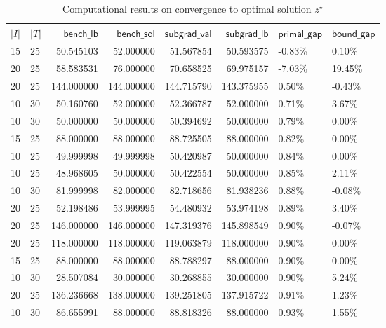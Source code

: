 \documentclass[
  a4paper,
,tablecaptionabove
]{scrartcl}
\numberwithin{equation}{section}
\begin{document}
\begin{table}
\caption{Computational results on convergence to optimal solution $z^\star$} \label{tab:sgsconv} 
\begin{tabular}{|l|l|r|r|r|r|l|l|}
\toprule
 $|I|$ & $|T|$ & $\mathsf{bench\_lb}$ &  $\mathsf{bench\_sol}$ & $\mathsf {subgrad\_val}$ &  $\mathsf{subgrad\_lb}$ & $\mathsf{primal\_gap}$ & $\mathsf{bound\_gap}$ \\
\midrule
 15 &  25 &   50.545103 &   52.000000 &    51.567854 &   50.593575 &     -0.83\% &     0.10\% \\
 20 &  25 &   58.583531 &   76.000000 &    70.658525 &   69.975157 &     -7.03\% &    19.45\% \\
 20 &  25 &  144.000000 &  144.000000 &   144.715790 &  143.375955 &      0.50\% &    -0.43\% \\
 10 &  30 &   50.160760 &   52.000000 &    52.366787 &   52.000000 &      0.71\% &     3.67\% \\
 10 &  30 &   50.000000 &   50.000000 &    50.394692 &   50.000000 &      0.79\% &     0.00\% \\
 15 &  25 &   88.000000 &   88.000000 &    88.725505 &   88.000000 &      0.82\% &     0.00\% \\
 10 &  25 &   49.999998 &   49.999998 &    50.420987 &   50.000000 &      0.84\% &     0.00\% \\
 10 &  25 &   48.968605 &   50.000000 &    50.422554 &   50.000000 &      0.85\% &     2.11\% \\
 10 &  30 &   81.999998 &   82.000000 &    82.718656 &   81.938236 &      0.88\% &    -0.08\% \\
 20 &  25 &   52.198486 &   53.999995 &    54.480932 &   53.974198 &      0.89\% &     3.40\% \\
 20 &  25 &  146.000000 &  146.000000 &   147.319376 &  145.898549 &      0.90\% &    -0.07\% \\
 20 &  25 &  118.000000 &  118.000000 &   119.063879 &  118.000000 &      0.90\% &     0.00\% \\
 15 &  25 &   88.000000 &   88.000000 &    88.788297 &   88.000000 &      0.90\% &     0.00\% \\
 10 &  30 &   28.507084 &   30.000000 &    30.268855 &   30.000000 &      0.90\% &     5.24\% \\
 20 &  25 &  136.236668 &  138.000000 &   139.251805 &  137.915722 &      0.91\% &     1.23\% \\
 10 &  30 &   86.655991 &   88.000000 &    88.818326 &   88.000000 &      0.93\% &     1.55\% \\

\end{tabular}
\end{table}
\end{document}
